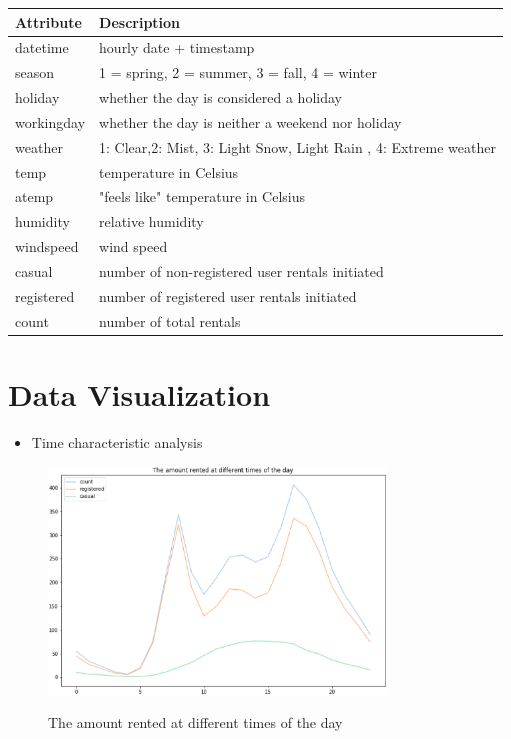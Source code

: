   \bigskip 
    \begin{tabular}{ l | l }
      \toprule
      Attribute     &  Description          \\
      \midrule
      datetime       &  hourly date + timestamp  \\
      season      & 1 = spring, 2 = summer, 3 = fall, 4 = winter\\ 
      holiday  & whether the day is considered a holiday\\
      workingday & whether the day is neither a weekend nor holiday\\
      weather    & 1: Clear,2: Mist, 3: Light Snow, Light Rain , 4: Extreme weather\\ 
      temp  & temperature in Celsius\\
      atemp  & "feels like" temperature in Celsius\\
      humidity  & relative humidity\\
      windspeed  &  wind speed\\
      casual  & number of non-registered user rentals initiated\\
      registered  & number of registered user rentals initiated\\
      count  & number of total rentals \\
  
      \bottomrule
    \end{tabular}


\section{Data Visualization} \label{sec-visualize}


\begin{itemize}
\item
Time characteristic analysis
\end{itemize} 
\begin{figure}
\centering
{}
\includegraphics[width=0.8\textwidth]{figures//Time_trends_day.eps}\\
\caption{The amount rented at different times of the day} \label{framework}
\end{figure}




